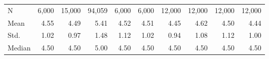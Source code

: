 \begin{tabular}{llllllllll}
\multicolumn{1}{l}{\hspace{1em}N} &
  \multicolumn{1}{r}{6,000} &
  \multicolumn{1}{r}{15,000} &
  \multicolumn{1}{r}{94,059} &
  \multicolumn{1}{r}{6,000} &
  \multicolumn{1}{r}{6,000} &
  \multicolumn{1}{r}{12,000} &
  \multicolumn{1}{r}{12,000} &
  \multicolumn{1}{r}{12,000} &
  \multicolumn{1}{r}{12,000} \\
\multicolumn{1}{l}{\hspace{1em}Mean} &
  \multicolumn{1}{r}{4.55} &
  \multicolumn{1}{r}{4.49} &
  \multicolumn{1}{r}{5.41} &
  \multicolumn{1}{r}{4.52} &
  \multicolumn{1}{r}{4.51} &
  \multicolumn{1}{r}{4.45} &
  \multicolumn{1}{r}{4.62} &
  \multicolumn{1}{r}{4.50} &
  \multicolumn{1}{r}{4.44} \\
\multicolumn{1}{l}{\hspace{1em}Std.} &
  \multicolumn{1}{r}{1.02} &
  \multicolumn{1}{r}{0.97} &
  \multicolumn{1}{r}{1.48} &
  \multicolumn{1}{r}{1.12} &
  \multicolumn{1}{r}{1.02} &
  \multicolumn{1}{r}{0.94} &
  \multicolumn{1}{r}{1.08} &
  \multicolumn{1}{r}{1.12} &
  \multicolumn{1}{r}{1.00} \\
\multicolumn{1}{l}{\hspace{1em}Median} &
  \multicolumn{1}{r}{4.50} &
  \multicolumn{1}{r}{4.50} &
  \multicolumn{1}{r}{5.00} &
  \multicolumn{1}{r}{4.50} &
  \multicolumn{1}{r}{4.50} &
  \multicolumn{1}{r}{4.50} &
  \multicolumn{1}{r}{4.50} &
  \multicolumn{1}{r}{4.50} &
  \multicolumn{1}{r}{4.50} \\
\bottomrule
\end{tabular}
